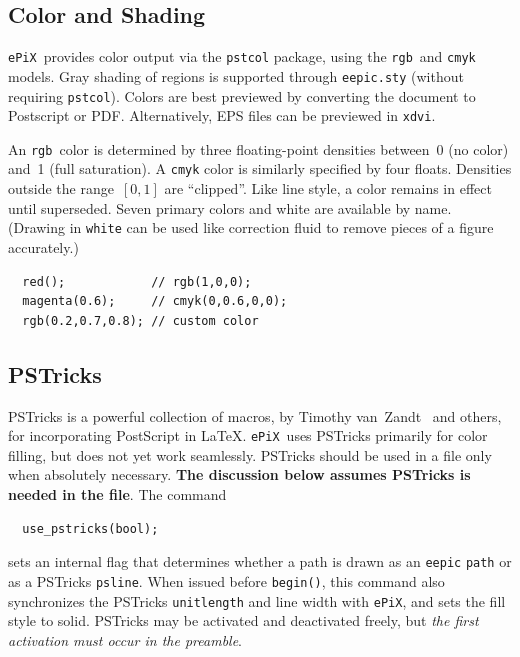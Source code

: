 \documentclass[12pt]{report}
\newcommand{\code}[1]{\texttt{#1}}
\newcommand{\filename}[1]{\texttt{#1}}
\newcommand{\ePiX}{\code{ePiX}}
\begin{document}
\subsection*{Color and Shading} 

 \ePiX\ provides color output via the \code{pstcol}
package, using the \code{rgb}~and \code{cmyk} models. Gray shading of
regions is supported through \filename{eepic.sty} (without requiring
\code{pstcol}).  Colors are best previewed by converting the document
to Postscript or PDF. Alternatively, EPS files can be previewed in
\code{xdvi}.

An \code{rgb}~color is determined by three floating-point densities
between~0 (no color) and~1 (full saturation).  A \code{cmyk} color
is similarly specified by four floats. Densities outside the
range~$[0,1]$ are ``clipped''.  Like line style, a color remains in
effect until superseded. Seven primary colors and white are available
by name. (Drawing in \code{white} can be used like correction fluid
to remove pieces of a figure accurately.)
\begin{verbatim}
  red();            // rgb(1,0,0);
  magenta(0.6);     // cmyk(0,0.6,0,0);
  rgb(0.2,0.7,0.8); // custom color
\end{verbatim}


\subsection*{PSTricks}

PSTricks is a powerful collection of macros, by Timothy
van~Zandt~\cite{Z} and others, for incorporating PostScript in \LaTeX.
\ePiX\ uses PSTricks primarily for color filling, but does not yet
work seamlessly. PSTricks should be used in a file only when
absolutely necessary. \textbf{The discussion below assumes PSTricks is
  needed in the file}.  The command
\begin{verbatim}
  use_pstricks(bool);
\end{verbatim}
sets an internal flag that determines whether a path is drawn as an
\filename{eepic} \code{path} or as a PSTricks
\code{psline}. When issued before
\code{begin()}, this command also synchronizes the PSTricks
\code{unitlength} and line width with \ePiX, and sets the fill style
to solid.  PSTricks may be activated and deactivated freely, but
\emph{the first activation must occur in the preamble}.
\end{document}
